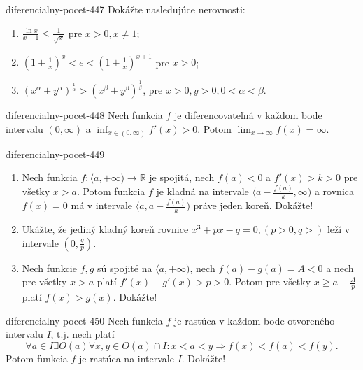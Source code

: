 \begin{defproblem}{diferencialny-pocet-447}
Dokážte nasledujúce nerovnosti:
\begin{multicols}{2}
\begin{enumerate}
    \item $\frac{\ln x}{x-1}\leq \frac{1}{\sqrt{x}}$ pre $x>0,x\neq 1$;
	\item $(1+\frac{1}{x})^x<e<(1+\frac{1}{x})^{x+1}$ pre $x>0$;
	\item $(x^{\alpha}+y^{\alpha})^{\frac{1}{\alpha}}>(x^{\beta}+y^{\beta})^{\frac{1}{\beta}}$, pre $x>0,y>0,0<\alpha<\beta$.
\end{enumerate}
\end{multicols}
\end{defproblem}

\begin{defproblem}{diferencialny-pocet-448}
Nech funkcia $f$ je diferencovateľná v každom bode intervalu $(0,\infty)$ a $\inf_{x\in (0,\infty)}f'(x)>0$. Potom $\lim_{x\rightarrow\infty}f(x)=\infty$.
\end{defproblem}

\begin{defproblem}{diferencialny-pocet-449}
\begin{enumerate}
\item Nech funkcia $f:\langle a,+\infty )\rightarrow\mathbb{R}$ je spojitá, nech $f(a)<0$ a $f'(x)>k>0$ pre všetky $x>a$. Potom funkcia $f$ je kladná na intervale $\langle a-\frac{f(a)}{k},\infty )$ a rovnica $f(x)=0$ má v intervale $\langle a,a-\frac{f(a)}{k} )$ práve jeden koreň. Dokážte!
\item Ukážte, že jediný kladný koreň rovnice $x^3+px-q=0,(p>0,q>)$ leží v intervale $(0,\frac{q}{p})$.
\item Nech funkcie $f,g$ sú spojité na $\langle a,+\infty)$, nech $f(a)-g(a)=A<0$ a nech pre všetky $x>a$ platí $f'(x)-g'(x)>p>0$. Potom pre všetky $x\geq a-\frac{A}{p}$ platí $f(x)>g(x)$. Dokážte!
\end{enumerate}
\end{defproblem}

\begin{defproblem}{diferencialny-pocet-450}
Nech funkcia $f$ je rastúca v každom bode otvoreného intervalu $I$, t.j. nech platí $$\forall a\in I \exists O(a) \forall x,y\in O(a)\cap I: x<a<y\Rightarrow f(x)<f(a)<f(y).$$
Potom funkcia $f$ je rastúca na intervale $I$. Dokážte!
\end{defproblem}


